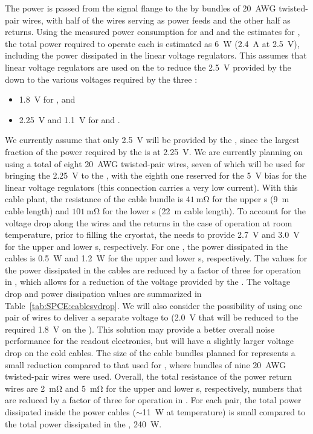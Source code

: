 The  power is passed from the signal flange to the
 by bundles of \SI{20}{AWG} twisted-pair wires, with half of
the wires serving as power feeds and the other half as returns.
Using the measured power consumption for  and 
and the estimates for , the total power required to
operate each  is estimated as \SI{6}{W} (\SI{2.4}{A}
at \SI{2.5}{V}), including the power dissipated in the linear voltage
regulators. This assumes that linear voltage regulators are
used on the  to reduce the \SI{2.5}{V} provided by the
 down to the various voltages required by the three
:
\begin{itemize}
\item \SI{1.8}{V} for , and
\item \SI{2.25}{V} and \SI{1.1}{V} for  and .
\end{itemize}
We currently assume that only \SI{2.5}{V} will be provided by the 
, since the largest fraction of the power required by
the  is at \SI{2.25}{V}. We are currently planning on using 
a total of eight \SI{20}{AWG} twisted-pair wires, seven of which will be used
for bringing the \SI{2.25}{V} to the , with the eighth
one reserved for the \SI{5}{V} bias for the linear voltage regulators
(this connection carries a very low current). With this cable plant, the
resistance of the cable bundle is $\SI{41}{\milli\ohm}$ for the upper 
s (\SI{9}{m} cable length) and $\SI{101}{\milli\ohm}$ for
the lower s (\SI{22}{m} cable length). To account for the
voltage drop along the wires and the returns in the case of operation
at room temperature, prior to filling the cryostat, the  needs to
provide \SI{2.7}{V} and \SI{3.0}{V} for the upper
and lower s, respectively. For one , the power
dissipated in the cables is \SI{0.5}{W} and \SI{1.2}{W} for the upper
and lower s, respectively. The values for the power 
dissipated in the cables are reduced by a factor of three for operation
in , which allows for a reduction of the voltage 
provided by the . The voltage drop and power dissipation
values are summarized in Table~\ref{tab:SPCE:cablesvdrop}.
We will also consider the possibility of using one pair of wires to
deliver a separate voltage to  (\SI{2.0}{V} that will be reduced to
the required \SI{1.8}{V} on the ). This solution may
provide a better overall noise performance for the readout electronics,
but will have a slightly larger voltage drop on the cold cables.
The size of the cable bundles planned
for  represents a small reduction compared to that used
for , where bundles of nine \SI{20}{AWG} twisted-pair wires
were used. Overall, the total resistance of the power return wires
are \SI{2}{\milli\ohm} and \SI{5}{\milli\ohm} for the upper and
lower s, respectively, numbers that are reduced by 
a factor of three for operation in . For each  pair, the total power 
dissipated inside the power cables ($\sim$\SI{11}{W} at  temperature)
is small compared to the total power dissipated in the ,
\SI{240}{W}.

